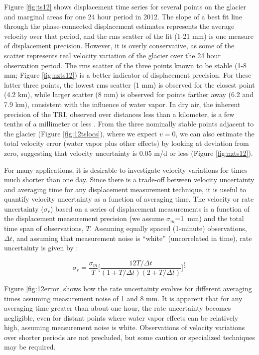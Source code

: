 \documentclass[review]{igs}
\begin{document}
Figure \ref{fig:ts12} shows displacement time series for several points on the glacier and marginal areas for one 24 hour period in 2012.   The slope of a best fit line through the phase-connected displacement estimates represents the average velocity over that period, and the rms scatter of the fit (1-21 mm) is one measure of displacement precision.   However, it is overly conservative, as some of the scatter represents real velocity variation of the glacier over the 24 hour observation period.  The rms scatter of the three points known to be stable (1-8 mm; Figure \ref{fig:nzts12}) is a better indicator of displacement precision. For these latter three points, the lowest rms scatter (1 mm) is observed for the closest point (4.2 km), while larger scatter (8 mm) is observed for points farther away (6.2 and 7.9 km), consistent with the influence of water vapor.  In dry air, the inherent precision of the TRI, observed over distances less than a kilometer, is a few tenths of a millimeter or less \citep{werner2008real}.  From the three 
nominally stable points adjacent to the glacier (Figure \ref{fig:12tslocs}), where we expect $v=0$, we can also estimate the total velocity error (water vapor plus other effects) by looking at deviation from zero, suggesting that velocity uncertainty is 0.05 m/d or less (Figure \ref{fig:nzts12}).

For many applications, it is desirable to investigate velocity variations for times much shorter than one day.  Since there is a trade-off between velocity uncertainty and averaging time for any displacement measurement technique, it is useful to quantify velocity uncertainty as a function of averaging time.   
The velocity or rate uncertainty ($\sigma_r$) based on a series of displacement measurements is a function of the displacement measurement precision (we assume $\sigma_m$=1~mm) and the total time span of observations, $T$.  Assuming equally spaced (1-minute) observations, $\Delta t$, and assuming that measurement noise is ``white'' (uncorrelated in time), rate uncertainty is given by \citep{coates1985space,dixon1991introduction,mao1999noise}: 

  
\begin{equation}\sigma_r=\frac{\sigma_m}{T}\Bigg[\frac{12T/\Delta t}{(1+T/\Delta t)(2+T/\Delta t)}\Bigg]^{\frac{1}{2}}\end{equation}
 

Figure \ref{fig:12error} shows how the rate uncertainty evolves for different averaging times assuming measurement noise of 1 and 8 mm.  It is apparent that for any averaging time greater than about one hour, the rate uncertainty becomes negligible, even for distant points where water vapor effects can be relatively high, assuming measurement noise is white.   Observations of velocity variations over shorter periods are not precluded, but some caution or specialized techniques may be required.  
\end{document}

